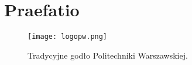 \newpage %
\section{Praefatio}
\lipsum[1] \cite{goossens93}
\begin{figure}[!h]
    \label{fig:anzelm}
    \centering \texttt{[image: logopw.png]}
    \caption{Tradycyjne godło Politechniki Warszawskiej.}
\end{figure}
\lipsum[2-10]

